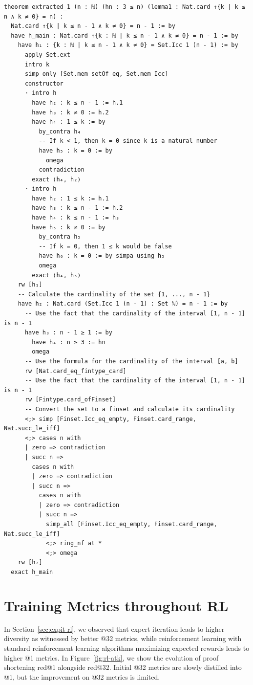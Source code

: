 \begin{tcolorbox}[colback=lightblue, boxrule=0pt, arc=5pt, outer arc=5pt, after skip=10pt plus 2pt]
\begin{lstlisting}[caption={Example of Proof Simplification Training Task (Length 295)},label={lst:proof-simp-training-ex2}, captionpos=t, language=lean, breaklines=true, style=mystyle]
theorem extracted_1 (n : ℕ) (hn : 3 ≤ n) (lemma1 : Nat.card ↑{k | k ≤ n ∧ k ≠ 0} = n) :
  Nat.card ↑{k | k ≤ n - 1 ∧ k ≠ 0} = n - 1 := by
  have h_main : Nat.card ↑{k : ℕ | k ≤ n - 1 ∧ k ≠ 0} = n - 1 := by
    have h₁ : {k : ℕ | k ≤ n - 1 ∧ k ≠ 0} = Set.Icc 1 (n - 1) := by
      apply Set.ext
      intro k
      simp only [Set.mem_setOf_eq, Set.mem_Icc]
      constructor
      · intro h
        have h₂ : k ≤ n - 1 := h.1
        have h₃ : k ≠ 0 := h.2
        have h₄ : 1 ≤ k := by
          by_contra h₄
          -- If k < 1, then k = 0 since k is a natural number
          have h₅ : k = 0 := by
            omega
          contradiction
        exact ⟨h₄, h₂⟩
      · intro h
        have h₂ : 1 ≤ k := h.1
        have h₃ : k ≤ n - 1 := h.2
        have h₄ : k ≤ n - 1 := h₃
        have h₅ : k ≠ 0 := by
          by_contra h₅
          -- If k = 0, then 1 ≤ k would be false
          have h₆ : k = 0 := by simpa using h₅
          omega
        exact ⟨h₄, h₅⟩
    rw [h₁]
    -- Calculate the cardinality of the set {1, ..., n - 1}
    have h₂ : Nat.card (Set.Icc 1 (n - 1) : Set ℕ) = n - 1 := by
      -- Use the fact that the cardinality of the interval [1, n - 1] is n - 1
      have h₃ : n - 1 ≥ 1 := by
        have h₄ : n ≥ 3 := hn
        omega
      -- Use the formula for the cardinality of the interval [a, b]
      rw [Nat.card_eq_fintype_card]
      -- Use the fact that the cardinality of the interval [1, n - 1] is n - 1
      rw [Fintype.card_ofFinset]
      -- Convert the set to a finset and calculate its cardinality
      <;> simp [Finset.Icc_eq_empty, Finset.card_range, Nat.succ_le_iff]
      <;> cases n with
      | zero => contradiction
      | succ n =>
        cases n with
        | zero => contradiction
        | succ n =>
          cases n with
          | zero => contradiction
          | succ n =>
            simp_all [Finset.Icc_eq_empty, Finset.card_range, Nat.succ_le_iff]
            <;> ring_nf at *
            <;> omega
    rw [h₂]
  exact h_main
\end{lstlisting}
\end{tcolorbox}

\newpage
\section{Training Metrics throughout RL} \label{sec:rl-metrics-all}
In Section~\ref{sec:expit-rl}, we observed that expert iteration leads to higher diversity as witnessed by better @32 metrics, while reinforcement learning with standard reinforcement learning algorithms maximizing expected rewards leads to higher @1 metrics. In Figure~\ref{fig:rl-atk}, we show the evolution of proof shortening red@1 alongside red@32. Initial @32 metrics are slowly distilled into @1, but the improvement on @32 metrics is limited.

